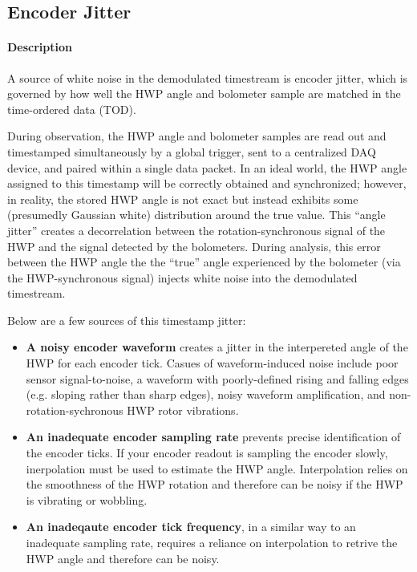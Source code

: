 \subsection{Encoder Jitter}

\paragraph{Description} 

A source of white noise in the demodulated timestream is encoder jitter, which is governed by how well the HWP angle and bolometer sample are matched in the time-ordered data (TOD). 

During observation, the HWP angle and bolometer samples are read out and timestamped simultaneously by a global trigger, sent to a centralized DAQ device, and paired within a single data packet. In an ideal world, the HWP angle assigned to this timestamp will be correctly obtained and synchronized; however, in reality, the stored HWP angle is not exact but instead exhibits some (presumedly Gaussian white) distribution around the true value. This ``angle jitter'' creates a decorrelation between the rotation-synchronous signal of the HWP and the signal detected by the bolometers. During analysis, this error between the HWP angle the the ``true'' angle experienced by the bolometer (via the HWP-synchronous signal) injects white noise into the demodulated timestream.

Below are a few sources of this timestamp jitter:

\begin{itemize}
 \item \textbf{A noisy encoder waveform} creates a jitter in the interpereted angle of the HWP for each encoder tick. Casues of waveform-induced noise include poor sensor signal-to-noise, a waveform with poorly-defined rising and falling edges (e.g. sloping rather than sharp edges), noisy waveform amplification, and non-rotation-sychronous HWP rotor vibrations.
 \item \textbf{An inadequate encoder sampling rate} prevents precise identification of the encoder ticks. If your encoder readout is sampling the encoder slowly, inerpolation must be used to estimate the HWP angle. Interpolation relies on the smoothness of the HWP rotation and therefore can be noisy if the HWP is vibrating or wobbling.
 \item \textbf{An inadeqaute encoder tick frequency}, in a similar way to an inadequate sampling rate, requires a reliance on interpolation to retrive the HWP angle and therefore can be noisy.
 \end{itemize}
 
